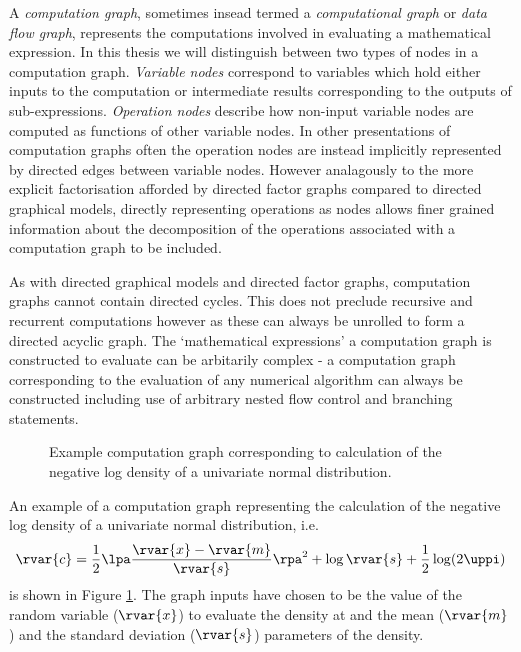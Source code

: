 A \emph{computation graph}, sometimes insead termed a \emph{computational graph} or \emph{data flow graph}, represents the computations involved in evaluating a mathematical expression. In this thesis we will distinguish between two types of nodes in a computation graph. \emph{Variable nodes} correspond to variables which hold either inputs to the computation or intermediate results corresponding to the outputs of sub-expressions. \emph{Operation nodes} describe how non-input variable nodes are computed as functions of other variable nodes. In other presentations of computation graphs often the operation nodes are instead implicitly represented by directed edges between variable nodes. However analagously to the more explicit factorisation afforded by directed factor graphs compared to directed graphical models, directly representing operations as nodes allows finer grained information about the decomposition of the operations associated with a computation graph to be included.

As with directed graphical models and directed factor graphs, computation graphs cannot contain directed cycles. This does not preclude recursive and recurrent computations however as these can always be unrolled to form a directed acyclic graph. The `mathematical expressions' a computation graph is constructed to evaluate can be arbitarily complex - a computation graph corresponding to the evaluation of any numerical algorithm can always be constructed including use of arbitrary nested flow control and branching statements.

\begin{figure}[!t]
\vskip 0pt
\centering
{}
\vskip 0pt
\caption[Example computation graph.]{Example computation graph corresponding to calculation of the negative log density of a univariate normal distribution.
}
\label{fig:gaussian-density-computation-graph}
\end{figure}

An example of a computation graph representing the calculation of the negative log density of a univariate normal distribution, i.e.
\begin{equation}\label{eq:gaussian-nld-computation-graph-expression}
  \rvar{c} =
  \frac{1}{2}\lpa\frac{\rvar{x} - \rvar{m}}{\rvar{s}}\rpa^2 + \log\rvar{s} + \frac{1}{2}\log(2\uppi)
\end{equation}
is shown in Figure \ref{fig:gaussian-density-computation-graph}. The graph inputs have chosen to be the value of the random variable ($\rvar{x}$) to evaluate the density at and the mean ($\rvar{m}$) and the standard deviation ($\rvar{s}$) parameters of the density. %

